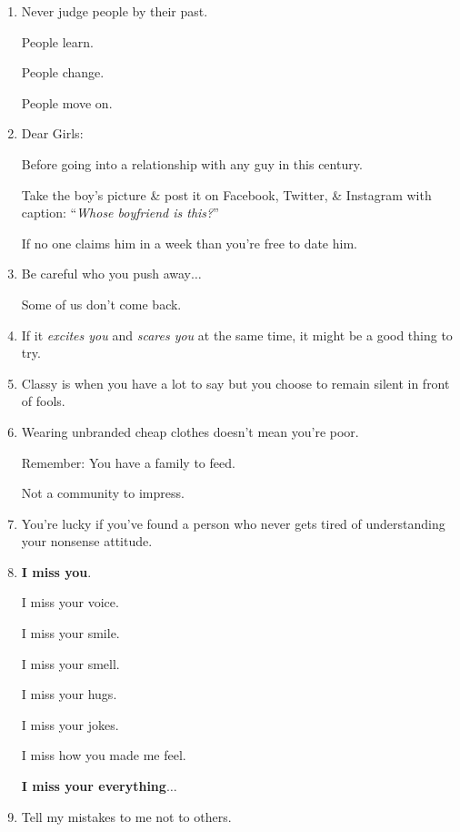 \documentclass{article}
\numberwithin{equation}{section}
\begin{document}
\begin{enumerate}
    \textit{Buddhism is a practice, like Yoga, you can be a Christian \& practice Buddhism}.
    
    \textit{I met a Catholic priest who lives in a Buddhist Monastery in France}.
    
    \textit{He told me that Buddhism makes him a better Christian}.
    
    \textit{I love that}.'' - Thich Nhat Hanh
    \item Never judge people by their past.
    
    People learn.
    
    People change.
    
    People move on.
    \item Dear Girls:
    
    Before going into a relationship with any guy in this century.
    
    Take the boy's picture \& post it on Facebook, Twitter, \& Instagram with caption: ``\textit{Whose boyfriend is this?}''
    
    If no one claims him in a week than you're free to date him.
    \item Be careful who you push away$\ldots$
    
    Some of us don't come back.
    \item If it \textit{excites you} and \textit{scares you} at the same time, it might be a good thing to try.
    \item Classy is when you have a lot to say but you choose to remain silent in front of fools.
    \item Wearing unbranded cheap clothes doesn't mean you're poor.
    
    Remember: You have a family to feed.
    
    Not a community to impress.
    \item You're lucky if you've found a person who never gets tired of understanding your nonsense attitude.
    \item \textbf{I miss you}.
    
    I miss your voice.
    
    I miss your smile.
    
    I miss your smell.
    
    I miss your hugs.
    
    I miss your jokes.
    
    I miss how you made me feel.
    
    \textbf{I miss your everything}$\ldots$
    \item Tell my mistakes to me not to others.
    

\end{enumerate}
\end{document}
